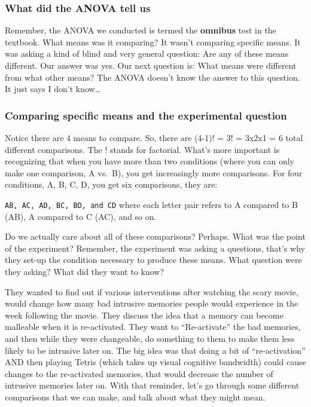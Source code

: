 \documentclass[]{book}
\theoremstyle{definition}
\theoremstyle{definition}
\theoremstyle{definition}
\theoremstyle{remark}
\begin{document}
\subsubsection{What did the ANOVA tell
us}\label{what-did-the-anova-tell-us}

Remember, the ANOVA we conducted is termed the \textbf{omnibus} test in
the textbook. What means was it comparing? It wasn't comparing specific
means. It was asking a kind of blind and very general question: Are any
of these means different. Our answer was yes. Our next question is: What
means were different from what other means? The ANOVA doesn't know the
answer to this question. It just says I don't know\ldots{}

\subsubsection{Comparing specific means and the experimental
question}\label{comparing-specific-means-and-the-experimental-question}

Notice there are 4 means to compare. So, there are (4-1)! = 3! = 3x2x1 =
6 total different comparisons. The ! stands for factorial. What's more
important is recognizing that when you have more than two conditions
(where you can only make one comparison, A vs.~B), you get increasingly
more comparisons. For four conditions, A, B, C, D, you get six
comparisons, they are:

\texttt{AB,\ AC,\ AD,\ BC,\ BD,\ and\ CD} where each letter pair refers
to A compared to B (AB), A compared to C (AC), and so on.

Do we actually care about all of these comparisons? Perhaps. What was
the point of the experiment? Remember, the experiment was asking a
questions, that's why they set-up the condition necessary to produce
these means. What question were they asking? What did they want to know?

They wanted to find out if various interventions after watching the
scary movie, would change how many bad intrusive memories people would
experience in the week following the movie. They discuss the idea that a
memory can become malleable when it is re-activated. They want to
``Re-activate'' the bad memories, and then while they were changeable,
do something to them to make them less likely to be intrusive later on.
The big idea was that doing a bit of ``re-activation'' AND then playing
Tetris (which takes up visual cognitive bandwidth) could cause changes
to the re-activated memories, that would decrease the number of
intrusive memories later on. With that reminder, let's go through some
different comparisons that we can make, and talk about what they might
mean.
\end{document}
